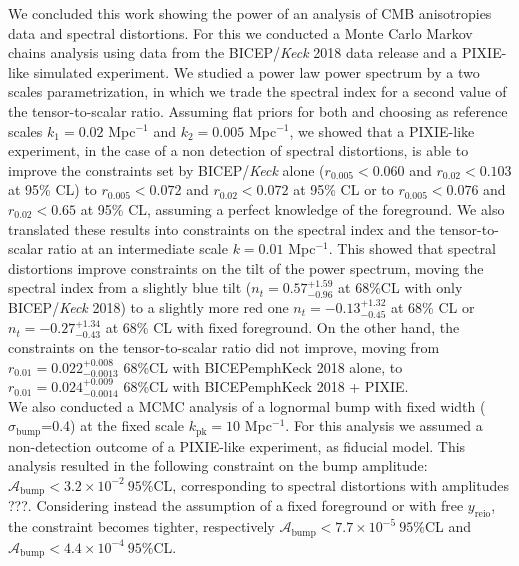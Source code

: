 We concluded this work showing the power of an analysis of CMB anisotropies data and spectral distortions. For this we conducted a Monte Carlo Markov chains analysis using data from the BICEP/\emph{Keck} 2018 data release and a PIXIE-like simulated experiment. We studied a power law power spectrum by a two scales parametrization, in which we trade the spectral index for a second value of the tensor-to-scalar ratio. Assuming flat priors for both and choosing as reference scales $k_1=0.02$ Mpc$^{-1}$ and $k_2=0.005$ Mpc$^{-1}$, we showed that a PIXIE-like experiment, in the case of a non detection of spectral distortions, is able to improve the constraints set by BICEP/\emph{Keck} alone ($r_{0.005}<0.060$ and $r_{0.02}<0.103$ at 95\% CL) to $r_{0.005}<0.072$ and $r_{0.02}<0.072$ at 95\% CL or to $r_{0.005}<0.076$ and $r_{0.02}<0.65$ at 95\% CL, assuming a perfect knowledge of the foreground. We also translated these results into constraints on the spectral index and the tensor-to-scalar ratio at an intermediate scale $k=0.01$ Mpc$^{-1}$. This showed that spectral distortions improve constraints on the tilt of the power spectrum, moving the spectral index from a slightly blue tilt ($n_t=0.57^{+1.59}_{-0.96}$ at 68\%CL with only BICEP/\emph{Keck} 2018) to a slightly more red one $n_t=-0.13^{+1.32}_{-0.45}$ at 68\% CL or $n_t=-0.27^{+1.34}_{-0.43}$ at 68\% CL with fixed foreground. On the other hand, the constraints on the tensor-to-scalar ratio did not improve, moving from $r_{0.01}=0.022^{+0.008}_{-0.0013}$ 68\%CL with BICEP\/emph{Keck} 2018 alone, to $r_{0.01}=0.024^{+0.009}_{-0.0014}$ 68\%CL with BICEP\/emph{Keck} 2018 + PIXIE.\\ We also conducted a MCMC analysis of a lognormal bump with fixed width ($\sigma_\text{bump}$=0.4) at the fixed scale $k_\text{pk}=10$ Mpc$^{-1}$. For this analysis we assumed a non-detection outcome of a PIXIE-like experiment, as fiducial model. This analysis resulted in the following constraint on the bump amplitude: $\mathcal A_\text{bump}<3.2\times10^{-2}\ 95\%$CL, corresponding to spectral distortions with amplitudes ???. Considering instead the assumption of a fixed foreground or with free $y_\text{reio}$, the constraint becomes tighter, respectively $\mathcal A_\text{bump}<7.7\times10^{-5}\ 95\%$CL and $\mathcal A_\text{bump}<4.4\times10^{-4}\ 95\%$CL.

